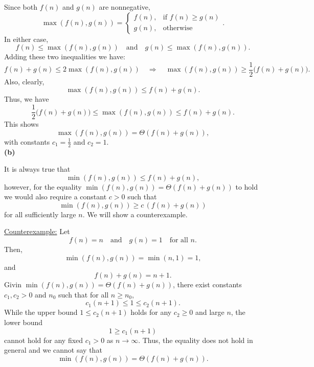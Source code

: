 \documentclass[11pt]{article}
\begin{document}
    Since both \(f(n)\) and \(g(n)\) are nonnegative,
    \[
    \max(f(n),g(n)) =
    \begin{cases}
    f(n), & \text{if } f(n)\ge g(n) \\[1mm]
    g(n), & \text{otherwise}
    \end{cases}.
    \]
    In either case,
    \[
    f(n)\le \max(f(n),g(n)) \quad \text{and} \quad g(n)\le \max(f(n),g(n)).
    \]
    Adding these two inequalities we have:
    \[
    f(n)+g(n) \le 2\max(f(n),g(n)) \quad \Longrightarrow \quad \max(f(n),g(n)) \ge \frac{1}{2}\bigl(f(n)+g(n)\bigr).
    \]
    Also, clearly,
    \[
    \max(f(n),g(n)) \le f(n)+g(n).
    \]
    Thus, we have
    \[
    \frac{1}{2}\bigl(f(n)+g(n)\bigr) \le \max(f(n),g(n)) \le f(n)+g(n).
    \]
    This shows
    \[
    \max(f(n),g(n))=\Theta(f(n)+g(n)),
    \]
    with constants \(c_1=\frac{1}{2}\) and \(c_2=1\).
    \\
    \textbf{(b)}

    It is always true that
    \[
    \min(f(n),g(n))\le f(n)+g(n),
    \]
    however, for the equality \(\min(f(n),g(n))=\Theta(f(n)+g(n))\) to hold we would also require a constant \(c>0\) such that
    \[
    \min(f(n),g(n)) \ge c\,(f(n)+g(n))
    \]
    for all sufficiently large \(n\). We will show a counterexample.

    \medskip

    \underline{Counterexample:}  
    Let
    \[
    f(n)=n \quad \text{and} \quad g(n)=1 \quad \text{for all } n.
    \]
    Then,
    \[
    \min(f(n),g(n))=\min(n,1)=1,
    \]
    and
    \[
    f(n)+g(n)=n+1.
    \]
    Givin \(\min(f(n),g(n))=\Theta(f(n)+g(n))\), there exist constants \(c_1, c_2>0\) and \(n_0\) such that for all \(n\ge n_0\),
    \[
    c_1 (n+1) \le 1 \le c_2 (n+1).
    \]
    While the upper bound \(1 \le c_2 (n+1)\) holds for any \(c_2\ge 0\) and large \(n\), the lower bound
    \[
    1 \ge c_1 (n+1)
    \]
    cannot hold for any fixed \(c_1>0\) as \(n\to\infty\). Thus, the equality does not hold in general and we cannot say that
    \[
    \min(f(n),g(n))=\Theta(f(n)+g(n)).
    \]
    
\end{document}
